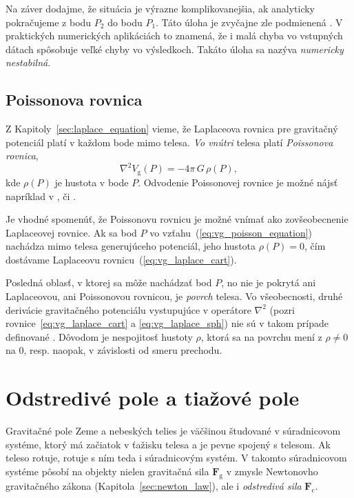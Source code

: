 \documentclass[a4paper, 12pt]{book}
\newcommand{\gidx}{\mathrm g}
\newcommand{\cidx}{\mathrm c}
\let\vec\mathbf
\begin{document}
Na záver dodajme, že situácia je výrazne komplikovanejšia, ak analyticky 
pokračujeme z bodu $P_2$ do bodu $P_1$.  Táto úloha je zvyčajne zle podmienená 
\citep{SansoGeodeticBoundaryValueProblem}.  V praktických numerických 
aplikáciách to znamená, že i malá chyba vo vstupných dátach spôsobuje veľké 
chyby vo výsledkoch.  Takáto úloha sa nazýva \emph{numericky nestabilná}.  

\subsection{Poissonova rovnica}
\label{sec:poisson_equation}

Z Kapitoly~\ref{sec:laplace_equation} vieme, že Laplaceova rovnica pre 
gravitačný potenciál platí v každom bode mimo telesa.  \emph{Vo vnútri} telesa 
platí \emph{Poissonova rovnica},
%
\begin{equation}
\label{eq:vg_poisson_equation}
\nabla^2 V_\gidx(P) = -4 \pi \, G \, \rho(P){,}
\end{equation}
%
kde $\rho(P)$ je hustota v bode $P$.  Odvodenie Poissonovej rovnice je možné 
nájsť napríklad v \cite{MacMillan1930}, \cite{Kellogg1967} či 
\cite{SansoGeoidDetermination}.

Je vhodné spomenúť, že Poissonovu rovnicu je možné vnímať ako zovšeobecnenie 
Laplaceovej rovnice.  Ak sa bod $P$ vo vzťahu~(\ref{eq:vg_poisson_equation}) 
nachádza mimo telesa generujúceho potenciál, jeho hustota $\rho(P) = 0$, čím 
dostávame Laplaceovu rovnicu~(\ref{eq:vg_laplace_cart}).

Posledná oblasť, v ktorej sa môže nachádzať bod $P$, no nie je pokrytá ani 
Laplaceovou, ani Poissonovou rovnicou, je \emph{povrch} telesa.  Vo 
všeobecnosti, druhé derivácie gravitačného potenciálu vystupujúce v operátore 
$\nabla^2$ (pozri rovnice~\ref{eq:vg_laplace_cart} a \ref{eq:vg_laplace_sph}) 
nie sú v takom prípade definované \citep{Kellogg1967}.  Dôvodom je nespojitosť 
hustoty $\rho$, ktorá sa na povrchu mení z $\rho \neq 0$ na 0, resp. naopak, 
v závislosti od smeru prechodu.





\section{Odstredivé pole a tiažové pole}

Gravitačné pole Zeme a nebeských telies je väčšinou študované v súradnicovom 
systéme, ktorý má začiatok v ťažisku telesa a je pevne spojený s telesom.  Ak 
teleso rotuje, rotuje s ním teda i súradnicovým systém.  V takomto súradnicovom 
systéme pôsobí na objekty nielen gravitačná sila $\vec F_\gidx$ v zmysle 
Newtonovho gravitačného zákona (Kapitola~\ref{sec:newton_law}), ale 
i \emph{odstredivá sila} $\vec F_\cidx$.
\end{document}

